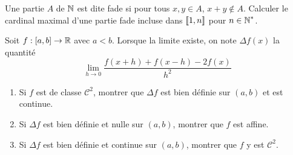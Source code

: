 \begin{exo}
    \label{misc1}
    Une partie $A$ de $\operatorname{\mathbb N}$ est dite fade si pour tous $x,y\in A$, $x+y\notin A$.
    Calculer le cardinal maximal d'une partie fade incluse dans $[\![1,n]\!]$ pour $n\in\operatorname{\mathbb N}^*$.
\end{exo}

\begin{exo}
    \label{misc2}
    Soit $f:[a,b]\to\operatorname{\mathbb R}$ avec $a<b$. Lorsque la limite existe, on note $\Delta f(x)$ la quantité 
    \[
        \lim_{h\to 0}\frac{f(x+h)+f(x-h)-2f(x)}{h^2}
    \]
    \begin{enumerate}
        \item Si $f$ est de classe $\mathcal C^2$, montrer que $\Delta f$ est bien définie sur $(a,b)$ et est continue.
        \item Si $\Delta f$ est bien définie et nulle sur $(a,b)$, montrer que $f$ est affine.
        \item Si $\Delta f$ est bien définie et continue sur $(a,b)$, montrer que $f$ y est $\mathcal C^2$. 
    \end{enumerate}
\end{exo}